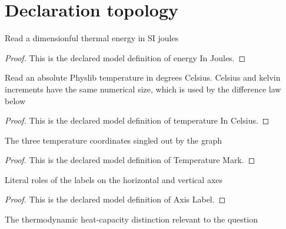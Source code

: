 \section{Declaration topology}
\begin{definition}
  \label{def:physics:phyx-mini-0379:phyxminiproblems-problemphyxmini0379-energyinjoules}
  Read a dimensionful thermal energy in SI joules
\end{definition}
\begin{proof}
  This is the declared model definition of energy In Joules.
\end{proof}
\begin{definition}
  \label{def:physics:phyx-mini-0379:phyxminiproblems-problemphyxmini0379-temperatureincelsius}
  Read an absolute Physlib temperature in degrees Celsius. Celsius and kelvin increments have the same numerical size, which is used by the difference law below
\end{definition}
\begin{proof}
  This is the declared model definition of temperature In Celsius.
\end{proof}
\begin{definition}
  \label{def:physics:phyx-mini-0379:phyxminiproblems-problemphyxmini0379-temperaturemark}
  The three temperature coordinates singled out by the graph
\end{definition}
\begin{proof}
  This is the declared model definition of Temperature Mark.
\end{proof}
\begin{definition}
  \label{def:physics:phyx-mini-0379:phyxminiproblems-problemphyxmini0379-axislabel}
  Literal roles of the labels on the horizontal and vertical axes
\end{definition}
\begin{proof}
  This is the declared model definition of Axis Label.
\end{proof}
\begin{definition}
  \label{def:physics:phyx-mini-0379:phyxminiproblems-problemphyxmini0379-heatcapacitykind}
  The thermodynamic heat-capacity distinction relevant to the question
\end{definition}

